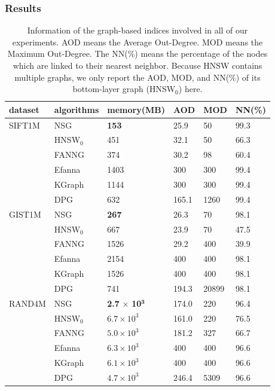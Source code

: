 \documentclass{vldb}
\begin{document}
\subsubsection{Results}

\begin{table}[t]\scriptsize
\caption{Information of the graph-based indices involved in all of our experiments. AOD means the Average Out-Degree. MOD means the Maximum Out-Degree. The NN(\%) means the percentage of the nodes which are linked to their nearest neighbor. Because HNSW contains multiple graphs, we only report the AOD, MOD, and NN(\%) of its bottom-layer graph (HNSW$_0$) here.}
\label{best_index_tb}
\centering
\begin{tabular}{|p{1.2cm}<{\centering}|p{1.2cm}<{\centering}|p{1.5cm}<{\centering}|p{0.7cm}<{\centering}|p{0.6cm}<{\centering}|p{0.7cm}<{\centering}|}
\hline
dataset & algorithms &memory(MB) & AOD & MOD & NN(\%) \\
\hline
\multirow{6}{*}{SIFT1M} 
& NSG & \textbf{153} &25.9& 50 & 99.3 \\
\cline{2-6}
&HNSW$_0$ & 451 &32.1& 50 & 66.3\\
\cline{2-6}
& FANNG & 374 &30.2& 98 & 60.4\\
\cline{2-6}
& Efanna & 1403 &300 &300 & 99.4 \\
\cline{2-6}
& KGraph & 1144&300&300 & 99.4\\
\cline{2-6}
& DPG & 632 & 165.1 & 1260 & 99.4 \\

\hline
\multirow{6}{*}{GIST1M} 
& NSG & \textbf{267} &26.3& 70 & 98.1\\
\cline{2-6}
& HNSW$_0$ & 667 &23.9 & 70 &47.5\\
\cline{2-6}
& FANNG & 1526 & 29.2&400 & 39.9\\
\cline{2-6}
& Efanna & 2154 &400 &400 &98.1\\
\cline{2-6}
& KGraph & 1526 &400& 400 &98.1\\
\cline{2-6}
& DPG & 741 & 194.3 & 20899 & 98.1\\
\hline

\multirow{6}{*}{RAND4M} 
& NSG & \textbf{2.7} $\times$ \textbf{10}$^\textbf{3}$ &174.0 & 220 & 96.4\\
\cline{2-6}
& HNSW$_0$ & $6.7 \times 10^3$ & 161.0 & 220 & 76.5\\
\cline{2-6}
& FANNG & $5.0 \times 10 ^3$ &181.2& 327  &66.7\\
\cline{2-6}
& Efanna & $6.3 \times 10^3$ & 400 &400  &96.6\\
\cline{2-6}
& KGraph & $6.1 \times 10^3$ &400 &400 &96.6\\
\cline{2-6}
& DPG & $4.7 \times 10^3$ & 246.4 & 5309 &96.6\\
\hline


\end{tabular}
\end{table}
\end{document}
